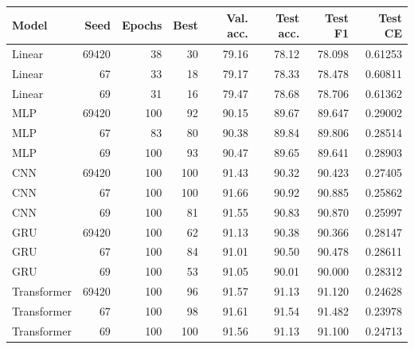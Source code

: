 \begin{tabular}{lrrrrrrr}
\toprule
Model & Seed & Epochs & Best & Val. acc. & Test acc. & Test F1 & Test CE \\
\midrule
Linear & 69420 & 38 & 30 & 79.16 & 78.12 & 78.098 & 0.61253 \\
Linear & 67 & 33 & 18 & 79.17 & 78.33 & 78.478 & 0.60811 \\
Linear & 69 & 31 & 16 & 79.47 & 78.68 & 78.706 & 0.61362 \\
MLP & 69420 & 100 & 92 & 90.15 & 89.67 & 89.647 & 0.29002 \\
MLP & 67 & 83 & 80 & 90.38 & 89.84 & 89.806 & 0.28514 \\
MLP & 69 & 100 & 93 & 90.47 & 89.65 & 89.641 & 0.28903 \\
CNN & 69420 & 100 & 100 & 91.43 & 90.32 & 90.423 & 0.27405 \\
CNN & 67 & 100 & 100 & 91.66 & 90.92 & 90.885 & 0.25862 \\
CNN & 69 & 100 & 81 & 91.55 & 90.83 & 90.870 & 0.25997 \\
GRU & 69420 & 100 & 62 & 91.13 & 90.38 & 90.366 & 0.28147 \\
GRU & 67 & 100 & 84 & 91.01 & 90.50 & 90.478 & 0.28611 \\
GRU & 69 & 100 & 53 & 91.05 & 90.01 & 90.000 & 0.28312 \\
Transformer & 69420 & 100 & 96 & 91.57 & 91.13 & 91.120 & 0.24628 \\
Transformer & 67 & 100 & 98 & 91.61 & 91.54 & 91.482 & 0.23978 \\
Transformer & 69 & 100 & 100 & 91.56 & 91.13 & 91.100 & 0.24713 \\
\bottomrule
\end{tabular}
